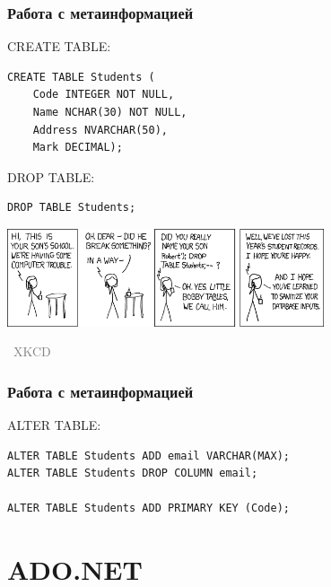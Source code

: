 \documentclass[xetex,mathserif,serif]{beamer}
\newcommand{\attribution}[1] {
\vspace{-5mm}\begin{flushright}\begin{scriptsize}\textcolor{gray}{\textcopyright\, #1}\end{scriptsize}\end{flushright}
}
\begin{document}
    \begin{frame}[fragile]
        \frametitle{Работа с метаинформацией}
        \begin{small}
            CREATE TABLE:
            \begin{verbatim}
CREATE TABLE Students (
    Code INTEGER NOT NULL,
    Name NCHAR(30) NOT NULL,
    Address NVARCHAR(50),
    Mark DECIMAL);
            \end{verbatim}

            \vspace{3mm}
            DROP TABLE:
            \begin{verbatim}
DROP TABLE Students;
            \end{verbatim}
        \end{small}

        \begin{center}
            \includegraphics[width=0.7\textwidth]{bobbyTables.png}
            \attribution{XKCD}
        \end{center}
    \end{frame}

    \begin{frame}[fragile]
        \frametitle{Работа с метаинформацией}
        ALTER TABLE:
        \begin{verbatim}
ALTER TABLE Students ADD email VARCHAR(MAX);
ALTER TABLE Students DROP COLUMN email;

ALTER TABLE Students ADD PRIMARY KEY (Code);

        \end{verbatim}
    \end{frame}

    \section{ADO.NET}
\end{document}
